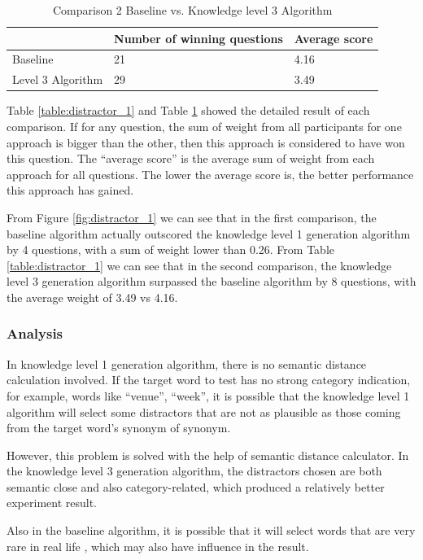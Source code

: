 \begin{table}[ht]
    \caption{Comparison 2 Baseline vs. Knowledge level 3 Algorithm}
    \label{table:distractor_2}
    \begin{center}
    \begin{tabular}{| p{1.5cm} | p{2.5cm} | p{2.2cm} |}
        \hline
         & Number of winning questions & Average score\\
        \hline
        Baseline & 21 & 4.16\\
        \hline
        Level 3 Algorithm & 29 & 3.49\\
        \hline
    \end{tabular}
    \end{center}
\end{table}

Table \ref{table:distractor_1} and Table \ref{table:distractor_2} showed the detailed result of each comparison. If for any question, the sum of weight from all participants for one approach is bigger than the other, then this approach is considered to have won this question. The “average score” is the average sum of weight from each approach for all questions. The lower the average score is, the better performance this approach has gained.

From Figure \ref{fig:distractor_1} we can see that in the first comparison, the baseline algorithm actually outscored the knowledge level 1 generation algorithm by 4 questions, with a sum of weight lower than 0.26. From Table \ref{table:distractor_1} we can see that in the second comparison, the knowledge level 3 generation algorithm surpassed the baseline algorithm by 8 questions, with the average weight of 3.49 vs 4.16. 

\subsubsection{Analysis}
In knowledge level 1 generation algorithm, there is no semantic distance calculation involved. If the target word to test has no strong category indication, for example, words like “venue”, “week”, it is possible that the knowledge level 1 algorithm will select some distractors that are not as plausible as those coming from the target word’s synonym of synonym. 

However, this problem is solved with the help of semantic distance calculator. In the knowledge level 3 generation algorithm, the distractors chosen are both semantic close and also category-related, which produced a relatively better experiment result.

Also in the baseline algorithm, it is possible that it will select words that are very rare in real life \cite{sus13}, which may also have influence in the result.
